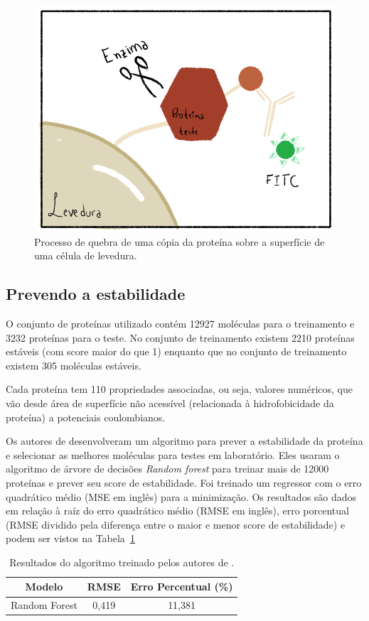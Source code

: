 \begin{figure}
    \centering
    \includegraphics[width=.8\textwidth]{images/yeast_cell.png}
    \caption{Processo de quebra de uma cópia da proteína sobre a superfície de uma 
            célula de levedura.}
    \label{fig:yeast_cell}
    \fautor
\end{figure}

\subsection{Prevendo a estabilidade}
O conjunto de proteínas utilizado contém 12927 moléculas para o treinamento e 
3232 proteínas para o teste. No conjunto de treinamento existem 2210 proteínas 
estáveis (com score maior do que 1) enquanto que no conjunto de treinamento 
existem 305 moléculas estáveis. 

Cada proteína tem 110 propriedades associadas, ou seja, valores numéricos,
que vão desde área de superfície não acessível (relacionada à hidrofobicidade
da proteína) a potenciais coulombianos.  

Os autores de \cite{Rocklin2017} desenvolveram um algoritmo para prever a estabilidade
da proteína e selecionar as melhores moléculas para testes em laboratório. Eles usaram 
o algoritmo de árvore de decisões \textit{Random forest} para treinar mais de 12000
proteínas e prever seu score de estabilidade. Foi treinado um regressor com o erro quadrático
médio (MSE em inglês) para a minimização. Os resultados são dados em relação à raíz do erro quadrático
médio (RMSE em inglês), erro porcentual (RMSE dividido pela diferença entre o maior e menor score
de estabilidade) e podem ser vistos na Tabela~\ref{tab:rockl_result}

\begin{table}[!htpb]
    \centering
    \caption{Resultados do algoritmo treinado pelos autores de \cite{Rocklin2017}.}
    \label{tab:rockl_result}
    \begin{tabular}{@{}ccc@{}}
    \toprule
    Modelo        & RMSE  & Erro Percentual (\%) \\ \midrule
    Random Forest & 0,419 & 11,381               \\ \bottomrule
    \end{tabular}
\end{table} 

